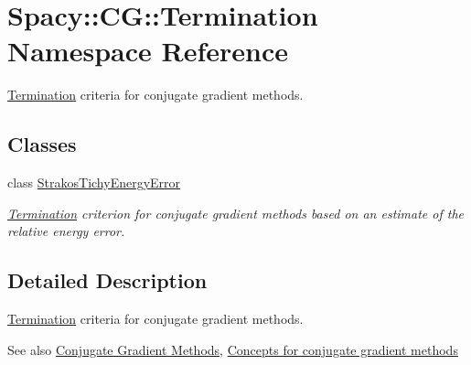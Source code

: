 \hypertarget{namespaceSpacy_1_1CG_1_1Termination}{}\section{Spacy\+:\+:C\+G\+:\+:Termination Namespace Reference}
\label{namespaceSpacy_1_1CG_1_1Termination}


\hyperlink{namespaceSpacy_1_1CG_1_1Termination}{Termination} criteria for conjugate gradient methods.  


\subsection*{Classes}
\begin{DoxyCompactItemize}
\item 
class \hyperlink{classSpacy_1_1CG_1_1Termination_1_1StrakosTichyEnergyError}{Strakos\+Tichy\+Energy\+Error}
\begin{DoxyCompactList}\small\item\em \hyperlink{namespaceSpacy_1_1CG_1_1Termination}{Termination} criterion for conjugate gradient methods based on an estimate of the relative energy error. \end{DoxyCompactList}\end{DoxyCompactItemize}


\subsection{Detailed Description}
\hyperlink{namespaceSpacy_1_1CG_1_1Termination}{Termination} criteria for conjugate gradient methods. 

\begin{DoxySeeAlso}{See also}
\hyperlink{group__CGGroup}{Conjugate Gradient Methods}, \hyperlink{group__CGConceptGroup}{Concepts for conjugate gradient methods} 
\end{DoxySeeAlso}
